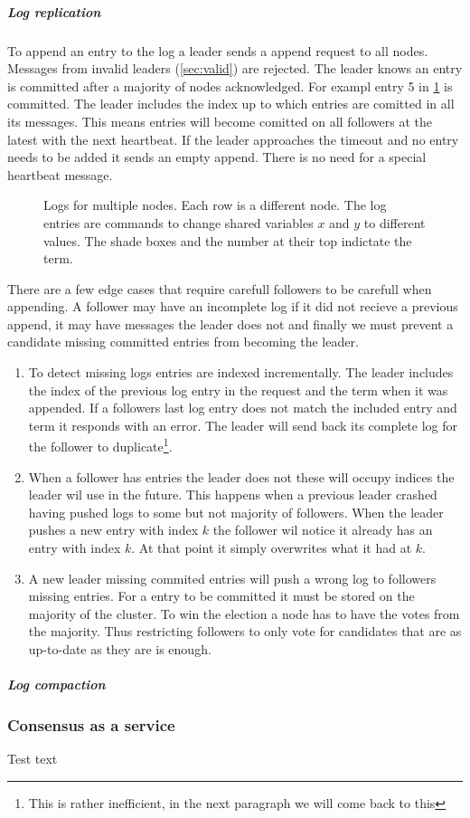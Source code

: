 \subparagraph{Log replication}
To append an entry to the log a leader sends a append request to all nodes. Messages from invalid leaders (\cref{sec:valid}) are rejected. The leader knows an entry is committed after a majority of nodes acknowledged. For exampl entry 5 in \cref{fig:raft_entries} is committed. The leader includes the index up to which entries are comitted in all its messages. This means entries will become comitted on all followers at the latest with the next heartbeat. If the leader approaches the timeout and no entry needs to be added it sends an empty append. There is no need for a special heartbeat message.

\begin{figure}[htbp]
	\centering
	
	\caption{Logs for multiple nodes. Each row is a different node. The log entries are commands to change shared variables $x$ and $y$ to different values. The shade boxes and the number at their top indictate the term.}
	\label{fig:raft_entries}
\end{figure}

There are a few edge cases that require carefull followers to be carefull when appending. A follower may have an incomplete log if it did not recieve a previous append, it may have messages the leader does not and finally we must prevent a candidate missing committed entries from becoming the leader.
%
\begin{enumerate}
	\item To detect missing logs entries are indexed incrementally. The leader includes the index of the previous log entry in the request and the term when it was appended. If a followers last log entry does not match the included entry and term it responds with an error. The leader will send back its complete log for the follower to duplicate\footnote{This is rather inefficient, in the next paragraph we will come back to this}.
	\item When a follower has entries the leader does not these will occupy indices the leader wil use in the future. This happens when a previous leader crashed having pushed logs to some but not majority of followers. When the leader pushes a new entry with index $k$ the follower wil notice it already has an entry with index $k$. At that point it simply overwrites what it had at $k$.
	\item A new leader missing commited entries will push a wrong log to followers missing entries. For a entry to be committed it must be stored on the majority of the cluster. To win the election a node has to have the votes from the majority. Thus restricting followers to only vote for candidates that are as up-to-date as they are is enough.
\end{enumerate}

\subparagraph{Log compaction} \label{par:logcomp}

\subsubsection*{Consensus as a service}
Test text
